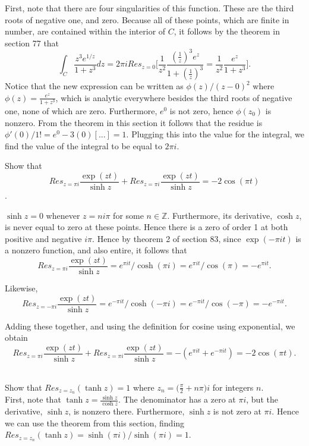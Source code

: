 \documentclass{article}
\theoremstyle{definition}
\newcommand{\Z}{\mathbb{Z}}
\newcommand{\cs}[1]{\color{blue}{#1}\normalcolor}
\begin{document}
 First, note that there are four singularities of this function. These are the third roots of negative one, and zero. Because all of these points, which are finite in number, are contained within the interior of $C$, it follows by the theorem in section 77 that 
$$\int_C\frac{z^3e^{1/z}}{1+z^3}dz = 2\pi iRes_{z = 0}\Big[\frac{1}{z^2}\frac{(\frac{1}{z})^3e^{z}}{1+(\frac{1}{z})^3} =\frac{1}{z^2}\frac{e^z}{1 + z^3}\Big].$$ Notice that the new expression can be written as $\phi(z)/(z-0)^2$ where $\phi(z)  = \frac{e^z}{1+z^3}$, which is analytic everywhere besides the third roots of negative one, none of which are zero. Furthermore, $e^0$ is not zero, hence $\phi(z_0)$ is nonzero. From the theorem in this section it follows that the residue is $\phi'(0)/1! = e^0 - 3(0)[...] = 1$. \cs{I cant tell what's going on in that $...$.} Plugging this into the value for the integral, we find the value of the integral to be equal to $2\pi i$.\\


\cs{4.5/5}

\cs{Sec 81: 14/15}

 Show that 
$$Res_{z = \pi i} \frac{\exp(zt)}{\sinh z} + Res_{z = \pi i}\frac{\exp(zt)}{\sinh z} = -2\cos(\pi t)$$.

 $\sinh z = 0$ whenever $z = ni\pi$ for some $n\in \Z$. Furthermore, its derivative, $\cosh z$, is never equal to zero at these points. Hence there is a zero of order 1 at both positive and negative $i\pi$. Hence by theorem 2 of section 83, since $\exp(-\pi it)$ is a nonzero function, and also entire, it follows that 
$$Res_{z = \pi i} \frac{\exp(zt)}{\sinh z} = e^{\pi i t}/\cosh (\pi i) = e^{\pi i t}/\cos(\pi) = -e^{\pi it}.$$

Likewise, $$Res_{z = -\pi i} \frac{\exp(zt)}{\sinh z} = e^{-\pi i t}/\cosh (-\pi i) = e^{-\pi i t}/\cos(-\pi) = -e^{-\pi it}.$$

Adding these together, and using the definition for cosine using exponential, we obtain 
$$ Res_{z = \pi i} \frac{\exp(zt)}{\sinh z} + Res_{z = \pi i}\frac{\exp(zt)}{\sinh z} = -(e^{\pi it} + e^{-\pi it}) = -2\cos(\pi t). $$\\

\cs{5/5}

 Show that $Res_{z = z_n}(\tanh z) = 1$ where $z_n = \Big(\frac{\pi}{2}+ n\pi\Big)i$ for integers $n$.\\

 First, note that $\tanh z = \frac{\sinh z}{\cosh z}$. The denominator has a zero at $\pi i$, but the derivative, $\sinh z$, is nonzero there. Furthermore, $\sinh z$ is not zero at $\pi i$. Hence we can use the theorem from this section, finding $Res_{z = z_n}(\tanh z) = \sinh(\pi i)/\sinh(\pi i) = 1$. \\
\end{document}
